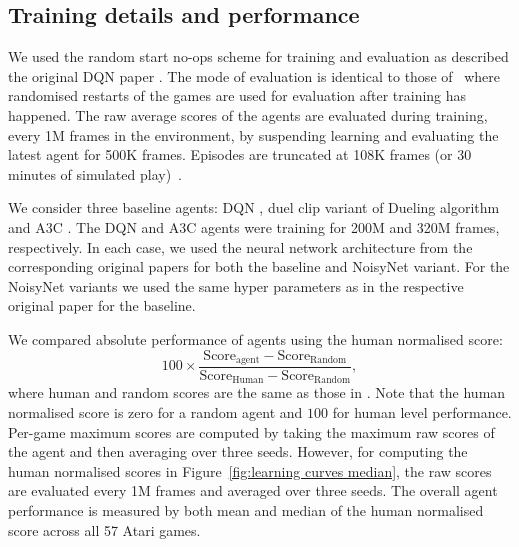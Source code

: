 \documentclass{article}
\newcommand{\algoinit}{NoisyNet}
\begin{document}
\subsection{Training details and performance}
We used the random start no-ops scheme for training and evaluation as described the original DQN paper \citep{mnih2015human}. 
The mode of evaluation is identical to those of~\cite{mnih2016asynchronous} where randomised restarts of the games are used for evaluation after training has happened. The raw average scores of the agents are evaluated during training, every 1M frames in the environment, by suspending learning and evaluating the latest agent for 500K frames. Episodes are truncated at 108K frames (or 30 minutes of simulated play)~\citep{van2016deep}.

We consider three baseline agents: DQN \citep{mnih2015human}, duel clip variant of Dueling algorithm~\citep{wang2016Dueling} and A3C \citep{mnih2016asynchronous}. The DQN and A3C agents were training for 200M and 320M frames, respectively.
In each case, we used the neural network architecture from the corresponding original papers for both the baseline and \algoinit{} variant. For the \algoinit{} variants we used the same hyper parameters as in the respective original paper for the baseline.

We compared absolute performance of agents using the human normalised score:
\begin{equation}
\label{eq:absolute.human.norm}
100 \times \frac{\text{Score}_{\text{agent}}-\text{Score}_{\text{Random}}}{\text{Score}_{\text{Human}}-\text{Score}_{\text{Random}}},
\end{equation}
where human and random scores are the same as those in \cite{wang2016Dueling}.
Note that the human normalised score is zero for a random agent and $100$ for human level performance. Per-game maximum scores are computed by taking the maximum raw scores of the agent and then averaging over three seeds. However, for computing the human normalised scores in Figure~\ref{fig:learning curves median}, the raw scores are evaluated every 1M frames and averaged over three seeds. The overall agent performance is measured by both mean and median of the human normalised score across all 57 Atari games.
\end{document}
